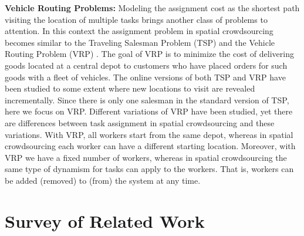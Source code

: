 \documentclass{USC-Thesis}
\numberwithin{equation}{chapter}
\begin{document}
\textbf{Vehicle Routing Problems:} Modeling the assignment cost as the shortest path visiting the location of multiple tasks brings another class of problems to attention. In this context the assignment problem in spatial crowdsourcing becomes similar to the Traveling Salesman Problem (TSP) \cite{lawler1985traveling} and the Vehicle Routing Problem (VRP) \cite{toth2001vehicle}. The goal of VRP is to minimize the cost of delivering goods located at a central depot to customers who have placed orders for such goods with a fleet of vehicles.  The online versions of both TSP and VRP have been studied to some extent where new locations to visit are revealed incrementally. Since there is only one salesman in the standard version of TSP, here we focus on VRP. Different variations of VRP have been studied, yet there are differences between task assignment in spatial crowdsourcing and these variations. 
With VRP, all workers start from the same depot, whereas in spatial crowdsourcing each worker can have a different starting location. Moreover, with VRP we have a fixed number of workers, whereas in spatial crowdsourcing the same type of dynamism for tasks can apply to the workers. That is, workers can be added (removed) to (from) the system at any time.


\chapter{Survey of Related Work}
\end{document}
